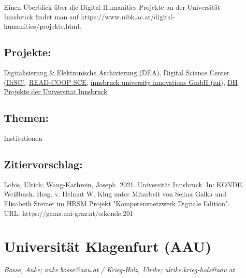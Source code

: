 \documentclass{article}
\begin{document}
        Einen Überblick über die Digital Humanities-Projekte an der Universität Innsbruck
                  findet man auf https://www.uibk.ac.at/digital-humanities/projekte.html. \\
            
        \subsection*{Projekte:}\href{https://www.uibk.ac.at/germanistik/einrichtungen/dea}{Digitalisierung & Elektronische Archivierung (DEA)}, \href{https://www.uibk.ac.at/disc/}{Digital Science
                           Center (DiSC)}, \href{https://readcoop.eu}{READ-COOP SCE}, \href{https://digital-innsbruck.at}{innsbruck
                           university innovations GmbH (iui)}, \href{https://www.uibk.ac.at/digital-humanities/projekte.html}{DH
                           Projekte der Universität Innsbruck}\subsection*{Themen:}Institutionen\subsection*{Zitiervorschlag:}Lobis, Ulrich; Wang-Kathrein, Joseph. 2021. Universität Innsbruck. In: KONDE Weißbuch. Hrsg. v. Helmut W. Klug unter Mitarbeit von Selina Galka und Elisabeth Steiner im HRSM Projekt "Kompetenznetzwerk Digitale Edition". URL: https://gams.uni-graz.at/o:konde.201\newpage\section*{Universität Klagenfurt (AAU)} \emph{Bosse, Anke; anke.bosse@aau.at / Krieg-Holz, Ulrike; ulrike.krieg-holz@aau.at }\\
        
\end{document}

